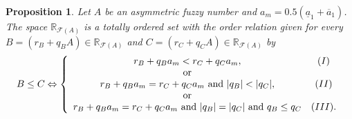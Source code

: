 \documentclass[12pt,a4paper]{article}
\newcommand{\RFA}{\mathbb{R}_{\mathcal{F}(A)}}
\newtheorem{proposition}{Proposition}
\begin{document}
\begin{proposition}\label{Proorder}
Let $A$ be an asymmetric fuzzy number and $a_m = 0.5(\underline{a}_1 + \overline{a}_1)$. The space $\RFA$ is a totally ordered set with the order relation given for every $B = (r_B + q_BA) \in \RFA$ and $C = (r_C + q_CA) \in \RFA$ by  
\begin{equation}\label{eq:order}
B \leq C \Leftrightarrow \left\lbrace \begin{array}{cc}
r_B + q_Ba_m < r_C + q_Ca_m, & \mbox(I) \\
     \mbox{ or }  & \\
r_B + q_Ba_m = r_C + q_Ca_m  \mbox{ and }  |q_B| < |q_C|, & \mbox(II) \\
     \mbox{ or } & \\
r_B + q_Ba_m = r_C + q_Ca_m  \mbox{ and }  |q_B| = |q_C|   \mbox{ and }  q_B \leq q_C & \mbox(III).
\end{array} \right.   
\end{equation}
\end{proposition}
\end{document}
